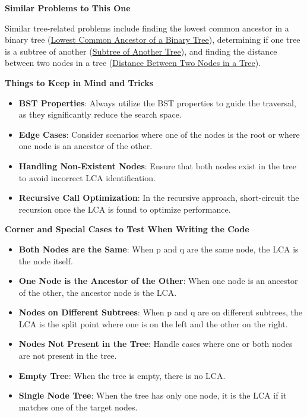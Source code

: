 \textbf{Similar Problems to This One}

Similar tree-related problems include finding the lowest common ancestor in a binary tree (\hyperref[problem:lowest_common_ancestor_of_a_binary_tree]{Lowest Common Ancestor of a Binary Tree}), determining if one tree is a subtree of another (\hyperref[problem:subtree_of_another_tree]{Subtree of Another Tree}), and finding the distance between two nodes in a tree (\hyperref[problem:distance_between_two_nodes_in_a_tree]{Distance Between Two Nodes in a Tree}).

\textbf{Things to Keep in Mind and Tricks}

\begin{itemize}
    \item \textbf{BST Properties}: Always utilize the BST properties to guide the traversal, as they significantly reduce the search space.
    \item \textbf{Edge Cases}: Consider scenarios where one of the nodes is the root or where one node is an ancestor of the other.
    \item \textbf{Handling Non-Existent Nodes}: Ensure that both nodes exist in the tree to avoid incorrect LCA identification.
    \item \textbf{Recursive Call Optimization}: In the recursive approach, short-circuit the recursion once the LCA is found to optimize performance.
\end{itemize}

\textbf{Corner and Special Cases to Test When Writing the Code}

\begin{itemize}
    \item \textbf{Both Nodes are the Same}: When p and q are the same node, the LCA is the node itself.
    \item \textbf{One Node is the Ancestor of the Other}: When one node is an ancestor of the other, the ancestor node is the LCA.
    \item \textbf{Nodes on Different Subtrees}: When p and q are on different subtrees, the LCA is the split point where one is on the left and the other on the right.
    \item \textbf{Nodes Not Present in the Tree}: Handle cases where one or both nodes are not present in the tree.
    \item \textbf{Empty Tree}: When the tree is empty, there is no LCA.
    \item \textbf{Single Node Tree}: When the tree has only one node, it is the LCA if it matches one of the target nodes.
\end{itemize}